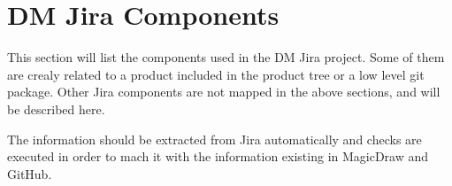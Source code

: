 \newpage
\section{DM Jira Components}\label{sec:jiracomponents}

This section will list the components used in the DM Jira project.
Some of them are crealy related to a product included in the product tree or a low level git package.
Other Jira components are not mapped in the above sections, and will be described here.

The information should be extracted from Jira automatically and checks are executed in order to mach it with the information existing in MagicDraw and GitHub.
